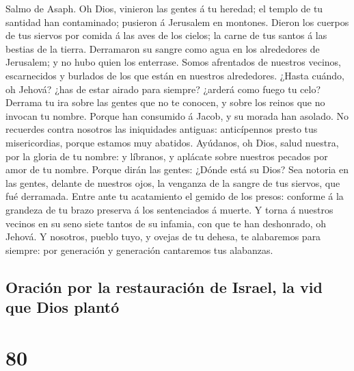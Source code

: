  Salmo de Asaph. Oh Dios, vinieron las gentes á tu
heredad; el templo de tu santidad han contaminado; pusieron á Jerusalem
en montones.  Dieron los cuerpos de tus siervos por comida
á las aves de los cielos; la carne de tus santos á las bestias de la
tierra.  Derramaron su sangre como agua en los alrededores
de Jerusalem; y no hubo quien los enterrase.  Somos
afrentados de nuestros vecinos, escarnecidos y burlados de los que están
en nuestros alrededores.  ¿Hasta cuándo, oh Jehová? ¿has
de estar airado para siempre? ¿arderá como fuego tu celo? 
Derrama tu ira sobre las gentes que no te conocen, y sobre los reinos
que no invocan tu nombre.  Porque han consumido á Jacob, y
su morada han asolado.  No recuerdes contra nosotros las
iniquidades antiguas: anticípennos presto tus misericordias, porque
estamos muy abatidos.  Ayúdanos, oh Dios, salud nuestra,
por la gloria de tu nombre: y líbranos, y aplácate sobre nuestros
pecados por amor de tu nombre.  Porque dirán las gentes:
¿Dónde está su Dios? Sea notoria en las gentes, delante de nuestros
ojos, la venganza de la sangre de tus siervos, que fué derramada.
 Entre ante tu acatamiento el gemido de los presos:
conforme á la grandeza de tu brazo preserva á los sentenciados á muerte.
 Y torna á nuestros vecinos en su seno siete tantos de su
infamia, con que te han deshonrado, oh Jehová.  Y
nosotros, pueblo tuyo, y ovejas de tu dehesa, te alabaremos para
siempre: por generación y generación cantaremos tus alabanzas.

\hypertarget{oraciuxf3n-por-la-restauraciuxf3n-de-israel-la-vid-que-dios-plantuxf3}{%
\subsection{Oración por la restauración de Israel, la vid que Dios
plantó}\label{oraciuxf3n-por-la-restauraciuxf3n-de-israel-la-vid-que-dios-plantuxf3}}

\hypertarget{section-79}{%
\section{80}\label{section-79}}


